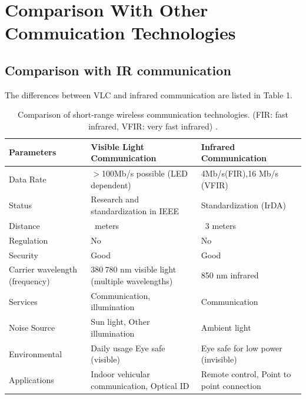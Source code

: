 \section{Comparison With Other Commuication Technologies}

\subsection{Comparison with IR communication}

The differences between VLC and infrared communication are listed in Table 1.

\begin{table}[h]
\caption{Comparison of short-range wireless communication technologies. (FIR: fast infrared, VFIR: very fast infrared) \cite{r15}.}
\centering

\begin{tabular}{|p{1in}|p{2in}|p{2in}|}

  \hline
  Parameters & Visible Light Communication & Infrared Communication \\
  \hline
  Data Rate & $>$100Mb/s possible (LED dependent)& 4Mb/s(FIR),16 Mb/s (VFIR) \\
  \hline
  Status & Research and standardization in IEEE & Standardization (IrDA) \\
  \hline
  Distance & ~meters & ~3 meters \\
  \hline
  Regulation & No & No \\
  \hline
  Security & Good & Good \\
  \hline
  Carrier wavelength (frequency) & 380$~$780 nm visible light (multiple wavelengths) & 850 nm infrared \\
  \hline
  Services & Communication, illumination & Communication \\
  \hline
  Noise Source & Sun light, Other illumination & Ambient light \\
  \hline
  Environmental & Daily usage Eye safe (visible) & Eye safe for low power (invisible) \\
  \hline
  Applications & Indoor vehicular communication, Optical ID & Remote control, Point to point connection \\
  \hline
\end{tabular}
\label{table:comp}
\end{table}

